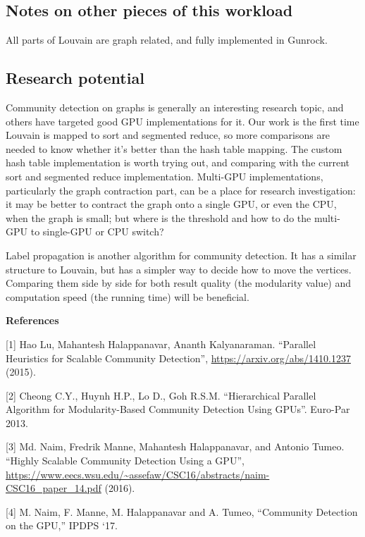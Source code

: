 \documentclass[10pt,oneside]{memoir}
\begin{document}
\hypertarget{notes-on-other-pieces-of-this-workload-4}{%
\subsection{Notes on other pieces of this
workload}\label{notes-on-other-pieces-of-this-workload-4}}

All parts of Louvain are graph related, and fully implemented in
Gunrock.

\hypertarget{research-potential-2}{%
\subsection{Research potential}\label{research-potential-2}}

Community detection on graphs is generally an interesting research
topic, and others have targeted good GPU implementations for it. Our
work is the first time Louvain is mapped to sort and segmented reduce,
so more comparisons are needed to know whether it's better than the hash
table mapping. The custom hash table implementation is worth trying out,
and comparing with the current sort and segmented reduce implementation.
Multi-GPU implementations, particularly the graph contraction part, can
be a place for research investigation: it may be better to contract the
graph onto a single GPU, or even the CPU, when the graph is small; but
where is the threshold and how to do the multi-GPU to single-GPU or CPU
switch?

Label propagation is another algorithm for community detection. It has a
similar structure to Louvain, but has a simpler way to decide how to
move the vertices. Comparing them side by side for both result quality
(the modularity value) and computation speed (the running time) will be
beneficial.

\textbf{References}

{[}1{]} Hao Lu, Mahantesh Halappanavar, Ananth Kalyanaraman. ``Parallel
Heuristics for Scalable Community Detection'',
\url{https://arxiv.org/abs/1410.1237} (2015).

{[}2{]} Cheong C.Y., Huynh H.P., Lo D., Goh R.S.M. ``Hierarchical
Parallel Algorithm for Modularity-Based Community Detection Using
GPUs''. Euro-Par 2013.

{[}3{]} Md. Naim, Fredrik Manne, Mahantesh Halappanavar, and Antonio
Tumeo. ``Highly Scalable Community Detection Using a GPU'',
\url{https://www.eecs.wsu.edu/~assefaw/CSC16/abstracts/naim-CSC16_paper_14.pdf}
(2016).

{[}4{]} M. Naim, F. Manne, M. Halappanavar and A. Tumeo, ``Community
Detection on the GPU,'' IPDPS `17.
\end{document}
